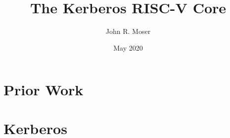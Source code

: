 \documentclass[a4paper,12pt]{book}
\begin{document}
\author{John R. Moser}
\title{The Kerberos RISC-V Core}
\date{May 2020}

\frontmatter
\maketitle

\cleardoublepage
\tableofcontents

\mainmatter
\part{Prior Work}





\part{Kerberos}



\backmatter
\end{document}
